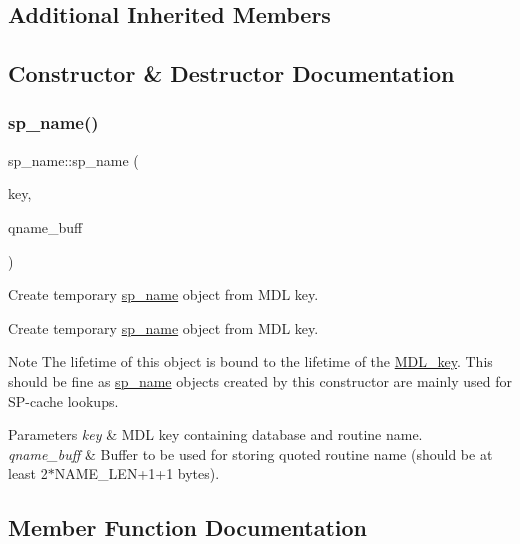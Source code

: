 \subsection*{Additional Inherited Members}


\subsection{Constructor \& Destructor Documentation}
\mbox{\label{classsp__name_ac3c55e826c7449a541ff7033d368bb2a}} 
\subsubsection{\texorpdfstring{sp\+\_\+name()}{sp\_name()}}
{\footnotesize\ttfamily sp\+\_\+name\+::sp\+\_\+name (\begin{DoxyParamCaption}\item[{const \mbox{\hyperlink{structMDL__key}{M\+D\+L\+\_\+key}} $\ast$}]{key,  }\item[{char $\ast$}]{qname\+\_\+buff }\end{DoxyParamCaption})}

Create temporary \mbox{\hyperlink{classsp__name}{sp\+\_\+name}} object from M\+DL key.

Create temporary \mbox{\hyperlink{classsp__name}{sp\+\_\+name}} object from M\+DL key.

\begin{DoxyNote}{Note}
The lifetime of this object is bound to the lifetime of the \mbox{\hyperlink{structMDL__key}{M\+D\+L\+\_\+key}}. This should be fine as \mbox{\hyperlink{classsp__name}{sp\+\_\+name}} objects created by this constructor are mainly used for SP-\/cache lookups.
\end{DoxyNote}

\begin{DoxyParams}{Parameters}
{\em key} & M\+DL key containing database and routine name. \\
\hline
{\em qname\+\_\+buff} & Buffer to be used for storing quoted routine name (should be at least 2$\ast$\+N\+A\+M\+E\+\_\+\+L\+EN+1+1 bytes). \\
\hline
\end{DoxyParams}


\subsection{Member Function Documentation}
\mbox{\label{classsp__name_a95e689b3d9e830936eb4460df42e2d39}} 
